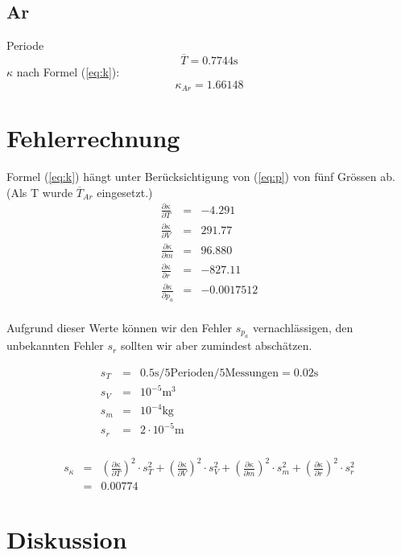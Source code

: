 \documentclass[12pt,a4paper]{article}
\begin{document}
\subsection*{Ar}
Periode
\[ \overline{T} = 0.7744\mbox{s} \]
$\kappa$ nach Formel (\ref{eq:k}):
\[ \kappa_{Ar} = 1.66148 \]

\section*{Fehlerrechnung}
Formel (\ref{eq:k}) h\"angt unter Ber\"ucksichtigung von (\ref{eq:p}) von f\"unf Gr\"ossen ab. (Als T wurde $\overline{T}_{Ar}$ eingesetzt.)
\begin{eqnarray*}
\frac{\partial \kappa}{\partial T} & = & -4.291\\
\frac{\partial \kappa}{\partial V} & = & 291.77\\
\frac{\partial \kappa}{\partial m} & = & 96.880\\
\frac{\partial \kappa}{\partial r} & = & -827.11\\
\frac{\partial \kappa}{\partial p_a} & = & -0.0017512\\
\end{eqnarray*}

\noindent
Aufgrund dieser Werte können wir den Fehler $s_{p_a}$ vernachlässigen, den unbekannten Fehler $s_r$ sollten wir aber zumindest abschätzen.

\begin{eqnarray*}
s_T & = & 0.5 \mbox{s} / 5 \mbox{Perioden} / 5 \mbox{Messungen} = 0.02 \mbox{s}\\
s_V & = & 10^{-5} \mbox{m}^3\\
s_m & = & 10^{-4} \mbox{kg}\\
s_r & = & 2\cdot 10^{-5} \mbox{m}\\
\end{eqnarray*}

\begin{eqnarray*}
s_\kappa & = & \left( \frac{\partial \kappa}{\partial T}\right) ^2\cdot s_T^2 + \left( \frac{\partial \kappa}{\partial V}\right) ^2\cdot s_V^2 + \left( \frac{\partial \kappa}{\partial m}\right) ^2\cdot s_m^2 + \left( \frac{\partial \kappa}{\partial r}\right) ^2\cdot s_r^2 \\
& = & 0.00774
\end{eqnarray*}

\section*{Diskussion}
\end{document}
